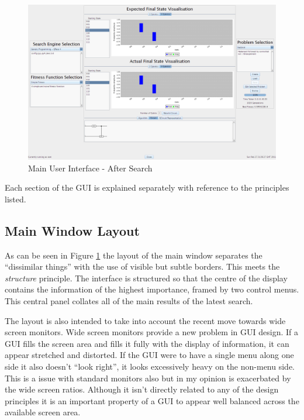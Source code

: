\begin{figure}
 \includegraphics[width=\textwidth]{GUIDesign.png}
\caption{Main User Interface - After Search}
\label{fig:MainGUIDesign}
\end{figure}

Each section of the GUI is explained separately with reference to the principles listed.

\subsection{Main Window Layout}
As can be seen in Figure \ref{fig:MainGUIDesign} the layout of the main window separates the ``dissimilar things'' with the use of visible but subtle borders.
This meets the \emph{structure} principle.
The interface is structured so that the centre of the display contains the information of the highest importance, framed  by two control menus.
This central panel collates all of the main results of the latest search.

The layout is also intended to take into account the recent move towards wide screen monitors.
Wide screen monitors provide a new problem in GUI design.
If a GUI fills the screen area and fills it fully with the display of information, it can appear stretched and distorted.
If the GUI were to have a single menu along one side it also doesn't ``look right'', it looks excessively heavy on the non-menu side.
This is a issue with standard monitors also but in my opinion is exacerbated by the wide screen ratios.
Although it isn't directly related to any of the design principles it is an important property of a GUI to appear well balanced across the available screen area.

